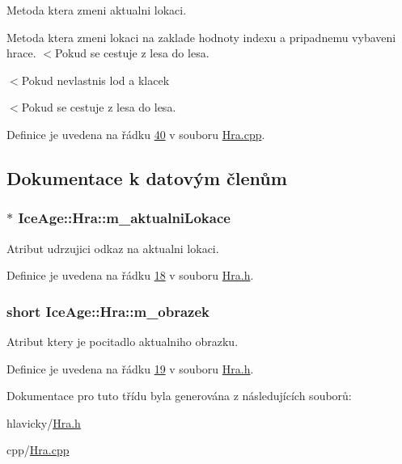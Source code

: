 Metoda ktera zmeni aktualni lokaci. 

Metoda ktera zmeni lokaci na zaklade hodnoty indexu a pripadnemu vybaveni hrace. $<$Pokud se cestuje z lesa do lesa.

$<$Pokud nevlastnis lod a klacek

$<$Pokud se cestuje z lesa do lesa. 

Definice je uvedena na řádku \hyperlink{Hra_8cpp_source_l00040}{40} v souboru \hyperlink{Hra_8cpp_source}{Hra.\+cpp}.



\subsection{Dokumentace k datovým členům}
\subsubsection[{\texorpdfstring{m\+\_\+aktualni\+Lokace}{m_aktualniLokace}}]{$\ast$ Ice\+Age\+::\+Hra\+::m\+\_\+aktualni\+Lokace\hspace{0.3cm}{\ttfamily [private]}}\hypertarget{classIceAge_1_1Hra_a2d006812c29f093c47054be30c8b7591}{}\label{classIceAge_1_1Hra_a2d006812c29f093c47054be30c8b7591}


Atribut udrzujici odkaz na aktualni lokaci. 



Definice je uvedena na řádku \hyperlink{Hra_8h_source_l00018}{18} v souboru \hyperlink{Hra_8h_source}{Hra.\+h}.

\subsubsection[{\texorpdfstring{m\+\_\+obrazek}{m_obrazek}}]{\setlength{\rightskip}{0pt plus 5cm}short Ice\+Age\+::\+Hra\+::m\+\_\+obrazek\hspace{0.3cm}{\ttfamily [private]}}\hypertarget{classIceAge_1_1Hra_aca22307d63587a6fc2f835fdf8b28a21}{}\label{classIceAge_1_1Hra_aca22307d63587a6fc2f835fdf8b28a21}


Atribut ktery je pocitadlo aktualniho obrazku. 



Definice je uvedena na řádku \hyperlink{Hra_8h_source_l00019}{19} v souboru \hyperlink{Hra_8h_source}{Hra.\+h}.



Dokumentace pro tuto třídu byla generována z následujících souborů\+:\begin{DoxyCompactItemize}
\item 
hlavicky/\hyperlink{Hra_8h}{Hra.\+h}\item 
cpp/\hyperlink{Hra_8cpp}{Hra.\+cpp}\end{DoxyCompactItemize}
